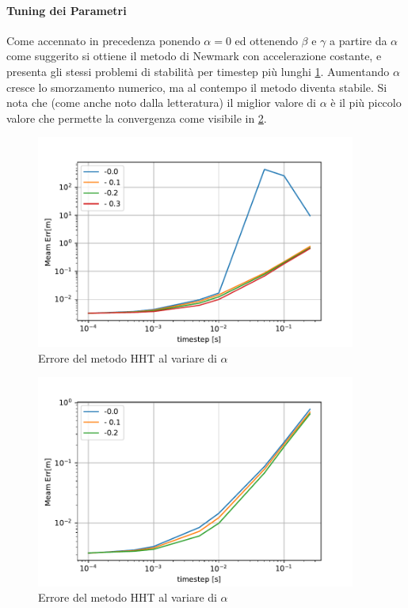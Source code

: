 \paragraph{Tuning dei Parametri}
Come accennato in precedenza ponendo $\alpha=0$ ed ottenendo $\beta$ e $\gamma$ a partire da $\alpha$ come suggerito si ottiene il metodo di Newmark con accelerazione costante, e presenta gli stessi problemi di stabilità per timestep più lunghi \ref{fig:HHTComp}. Aumentando $\alpha$ cresce lo smorzamento numerico, ma al contempo il metodo diventa stabile. Si nota che (come anche noto dalla letteratura) il miglior valore di $\alpha$ è il più piccolo valore che permette la convergenza come visibile in \ref{fig:HHTComp2}.
\begin{figure}[h!]
\centering
\includegraphics[height=7cm]{Figure/Convergenza/HHTComp.pdf}
\caption{Errore del metodo HHT al variare di $\alpha$}
 \label{fig:HHTComp}
\end{figure}
\begin{figure}[h!]
\centering
\includegraphics[height=7cm]{Figure/Convergenza/HHTComp2.pdf}
\caption{Errore del metodo HHT al variare di $\alpha$}
 \label{fig:HHTComp2}
\end{figure}
\FloatBarrier
